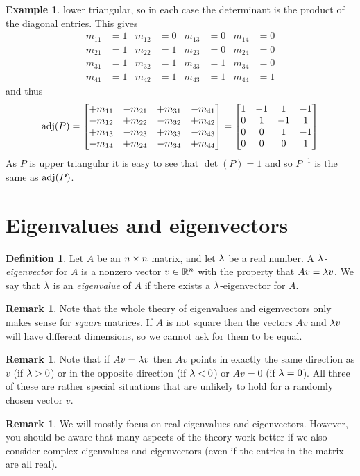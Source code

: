 \documentclass[reqno]{amsart}
\theoremstyle{definition}
\newtheorem{remark}[theorem]{Remark}
\newtheorem{definition}[theorem]{Definition}
\newtheorem{example}[theorem]{Example}
\newcommand{\dfn}[1]{\emph{{#1}}\index{#1}}
\begin{document}
\begin{example}
 lower triangular, so in each case the determinant is the product of
 the diagonal entries.  This gives
 \begin{align*}
  m_{11} &= 1 &
  m_{12} &= 0 &
  m_{13} &= 0 &
  m_{14} &= 0 \\
  m_{21} &= 1 &
  m_{22} &= 1 &
  m_{23} &= 0 &
  m_{24} &= 0 \\
  m_{31} &= 1 &
  m_{32} &= 1 &
  m_{33} &= 1 &
  m_{34} &= 0 \\
  m_{41} &= 1 &
  m_{42} &= 1 &
  m_{43} &= 1 &
  m_{44} &= 1
 \end{align*}
 and thus
 \[
  \operatorname{adj}(P) =
   \left[\begin{matrix} +m_{11} & -m_{21} & +m_{31} & -m_{41} \\
        -m_{12} & +m_{22} & -m_{32} & +m_{42} \\
        +m_{13} & -m_{23} & +m_{33} & -m_{43} \\
        -m_{14} & +m_{24} & -m_{34} & +m_{44}
   \end{matrix}\right]
   =
   \left[\begin{matrix}
     1 & -1 &  1 & -1 \\
     0 &  1 & -1 &  1 \\
     0 &  0 &  1 & -1 \\
     0 &  0 &  0 &  1
   \end{matrix}\right]
 \]
 As $P$ is upper triangular it is easy to see that $\det(P)=1$ and so
 $P^{-1}$ is the same as $\operatorname{adj}(P)$. 
\end{example}

\section{Eigenvalues and eigenvectors}
\label{sec-eigen}

\begin{definition}\label{defn-eigen}
 Let $A$ be an $n\times n$ matrix, and let $\lambda$ be a real number.  A
 \emph{$\lambda$-eigenvector} for $A$ is a nonzero
 vector $v\in{\mathbb{R}}^n$ with the property that $Av=\lambda v$.  We say that
 $\lambda$ is an \dfn{eigenvalue} of $A$ if there exists a
 $\lambda$-eigenvector for $A$. 
\end{definition}

\begin{remark}\label{rem-eigen-square}
 Note that the whole theory of eigenvalues and eigenvectors only makes
 sense for \emph{square} matrices.  If $A$ is not square then the
 vectors $Av$ and $\lambda v$ will have different dimensions, so we cannot
 ask for them to be equal.
\end{remark}
\begin{remark}
 Note that if $Av=\lambda v$ then $Av$ points in exactly the same direction
 as $v$ (if $\lambda>0$) or in the opposite direction (if $\lambda<0$) or
 $Av=0$ (if $\lambda=0$).  All three of these are rather special situations
 that are unlikely to hold for a randomly chosen vector $v$.
\end{remark}
\begin{remark}\label{rem-eigen-complex}
 We will mostly focus on real eigenvalues and eigenvectors.  However,
 you should be aware that many aspects of the theory work better if we
 also consider complex eigenvalues and eigenvectors (even if the
 entries in the matrix are all real).
\end{remark}
\end{document}
